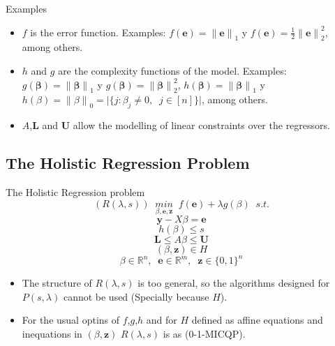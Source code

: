 \begin{frame}[t]{Examples}
	\begin{itemize}
	
	\item $f$ is the error function. Examples: $f(\mathbf{e}) = {\| \mathbf{e} \|}_1$ y $f(\mathbf{e}) =\frac{1}{2} {\| \mathbf{e} \|}^2_2$, among others.
	
	\item $h$ and $g$ are the complexity functions of the model. Examples: $g(\mathbf{\beta}) = {\| \mathbf{\beta} \|}_1$ y $g(\mathbf{\beta}) = {\| \mathbf{\beta} \|}^2_2$, $h(\mathbf{\beta}) = {\| \mathbf{\beta} \|}_1$ y $h(\beta) = {\| \beta \|}_0 = \vert \lbrace j: \beta_j \neq 0,\;\;j \in [n] \rbrace \vert$, among  others. 
	
	\item  $A$,$\mathbf{L}$ and $\mathbf{U}$ allow the modelling of linear constraints over the regressors.

	\end{itemize}
\end{frame}

\subsection{The Holistic Regression Problem}

\begin{frame}[t]{The Holistic Regression problem}
\[(R(\lambda,s))\;\;\underset{\beta,\mathbf{e},\mathbf{z}}{min}\;\;f(\mathbf{e}) + \lambda g(\beta)\;\;s.t.\]
\[\mathbf{y} - X \beta = \mathbf{e}\]
\[h(\beta) \leq s\]
\[\mathbf{L} \leq A\beta \leq \mathbf{U}\]
\[(\beta,\mathbf{z}) \in H\]
\[\beta \in \mathbb{R}^n,\;\;\mathbf{e} \in \mathbb{R}^m,\;\;\mathbf{z} \in {\lbrace 0,1 \rbrace}^n\]
	
	\begin{itemize}
		\item The structure of $R(\lambda,s)$ is too general, so the algorithms designed for $P(s, \lambda)$ cannot be used (Specially because $H$).
		\item For the usual optins of $f$,$g$,$h$ and for $H$ defined as affine equations and inequations in $(\beta,\mathbf{z})$ $R(\lambda,s)$ is as (0-1-MICQP).

\end{itemize}
\end{frame}

